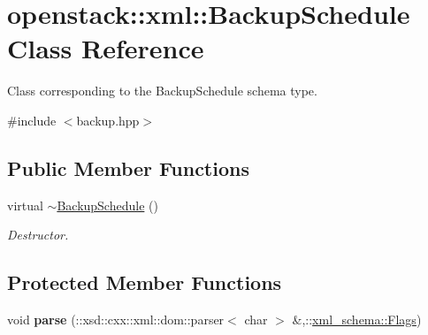 \hypertarget{classopenstack_1_1xml_1_1BackupSchedule}{
\section{openstack::xml::BackupSchedule Class Reference}
\label{classopenstack_1_1xml_1_1BackupSchedule}
}


Class corresponding to the BackupSchedule schema type.  




{\ttfamily \#include $<$backup.hpp$>$}

\subsection*{Public Member Functions}
\begin{DoxyCompactItemize}
\item 
\hypertarget{classopenstack_1_1xml_1_1BackupSchedule_aeb2faacb846bbf9859de2d08b04665c9}{
virtual \hyperlink{classopenstack_1_1xml_1_1BackupSchedule_aeb2faacb846bbf9859de2d08b04665c9}{$\sim$BackupSchedule} ()}
\label{classopenstack_1_1xml_1_1BackupSchedule_aeb2faacb846bbf9859de2d08b04665c9}

\begin{DoxyCompactList}\small\item\em Destructor. \item\end{DoxyCompactList}\end{DoxyCompactItemize}
\subsection*{Protected Member Functions}
\begin{DoxyCompactItemize}
\item 
\hypertarget{classopenstack_1_1xml_1_1BackupSchedule_a18e0aa7c28b038730a868e86182a9095}{
void {\bfseries parse} (::xsd::cxx::xml::dom::parser$<$ char $>$ \&,::\hyperlink{namespacexml__schema_affb4c227cbd9aa7453dd1dc5a1401943}{xml\_\-schema::Flags})}
\label{classopenstack_1_1xml_1_1BackupSchedule_a18e0aa7c28b038730a868e86182a9095}

\end{DoxyCompactItemize}
